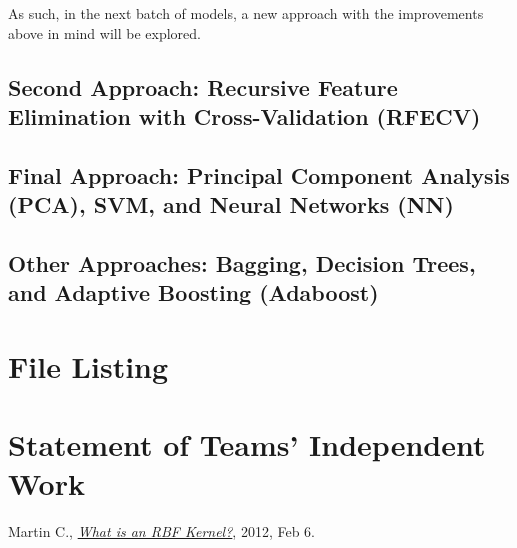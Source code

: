\documentclass{article}
\begin{document}
As such, in the next batch of models, a new approach with the improvements above in mind will be explored.
\newpage

\subsection{Second Approach: Recursive Feature Elimination with Cross-Validation (RFECV)}

\newpage

\subsection{Final Approach: Principal Component Analysis (PCA), SVM, and Neural Networks (NN)}

\newpage

\subsection{Other Approaches: Bagging, Decision Trees, and Adaptive Boosting (Adaboost)}


\section{File Listing}
\newpage
\section{Statement of Teams' Independent Work}
\newpage
\begin{thebibliography}{20}
	Martin C.,
	\emph{\href{https://charlesmartin14.wordpress.com/2012/02/06/kernels_part_1/}{What is an RBF Kernel?}},
	2012, Feb 6.
\end{thebibliography}
\end{document}
